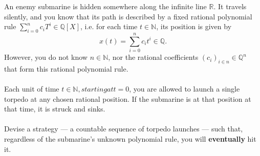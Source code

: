 \begin{problem}
    An enemy submarine is hidden somewhere along the infinite line \( \mathbb{R} \). It travels silently, and you know that its path is described by a fixed rational polynomial rule \( \sum_{i=0}^{n}c_iT^{i}\in\mathbb{Q}\left[X\right] \), i.e. for each time \( t \in \mathbb{N} \), its position is given by
    \[
        x\left(t\right) = \sum_{i=0}^{n} c_i t^{i}\in\mathbb{Q}.
    \]
    However, you do not know \( n \in \mathbb{N} \), nor the rational coefficients \( \left(c_i\right)_{i \in n} \in \mathbb{Q}^n \) that form this rational polynomial rule.
    \\\\
    Each unit of time \( t \in \mathbb{N}, starting at t=0 \), you are allowed to launch a single torpedo at any chosen rational position. If the submarine is at that position at that time, it is struck and sinks.
    \\\\
    Devise a strategy — a countable sequence of torpedo launches — such that, regardless of the submarine's unknown polynomial rule, you will \textbf{eventually} hit it.
\end{problem}

